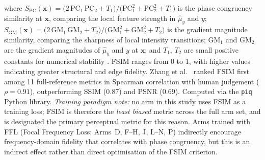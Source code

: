 \documentclass[12pt, a4paper, twoside, openright]{book}
\begin{document}
where $S_\mathrm{PC}(\mathbf{x}) = \bigl(2\,\mathrm{PC}_1\,\mathrm{PC}_2 + T_1\bigr)/
\bigl(\mathrm{PC}_1^2 + \mathrm{PC}_2^2 + T_1\bigr)$ is the phase congruency similarity
at $\mathbf{x}$, comparing the local feature strength in $\hat{\mu}_y$ and $y$;
$S_\mathrm{GM}(\mathbf{x}) = \bigl(2\,\mathrm{GM}_1\,\mathrm{GM}_2 + T_2\bigr)/
\bigl(\mathrm{GM}_1^2 + \mathrm{GM}_2^2 + T_2\bigr)$ is the gradient magnitude
similarity, comparing the sharpness of local intensity transitions; $\mathrm{GM}_1$ and
$\mathrm{GM}_2$ are the gradient magnitudes of $\hat{\mu}_y$ and $y$ at $\mathbf{x}$;
and $T_1$, $T_2$ are small positive constants for numerical stability \cite{zhang_fsim_2011}.
FSIM ranges from 0 to 1, with higher values indicating greater structural and edge fidelity.
Zhang et al.\ \cite{zhang_comprehensive_2012} ranked FSIM first among 11 full-reference
metrics in Spearman correlation with human judgement ($\rho = 0.91$), outperforming SSIM
($0.87$) and PSNR ($0.69$). Computed via the \texttt{piq} Python library. \textit{Training paradigm note:} no arm in this study uses FSIM as a training loss; FSIM is therefore the \emph{least biased} metric across the full arm set, and is designated the primary perceptual metric for this reason. Arms trained with FFL (Focal Frequency Loss; Arms~D, F--H, J, L--N, P) indirectly encourage frequency-domain fidelity that correlates with phase congruency, but this is an indirect effect rather than direct optimisation of the FSIM criterion.
\end{document}
